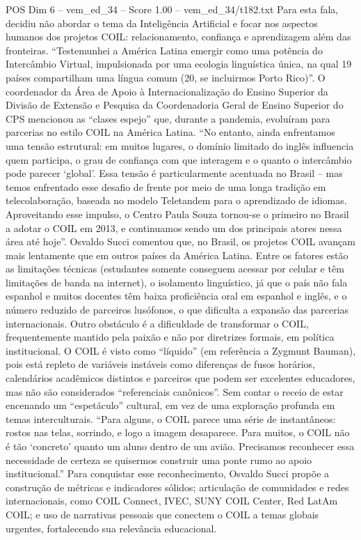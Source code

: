 \begin{textsample}{POS Dim 6 – vem\_ed\_34 – Score 1.00 – vem\_ed\_34/t182.txt}
Para esta fala, decidiu não abordar o tema da Inteligência Artificial e focar nos aspectos humanos dos projetos COIL: relacionamento, confiança e aprendizagem além das fronteiras. “Testemunhei a América Latina emergir como uma potência do Intercâmbio Virtual, impulsionada por uma ecologia linguística única, na qual 19 países compartilham uma língua comum (20, se incluirmos Porto Rico)”.
O coordenador da Área de Apoio à Internacionalização do Ensino Superior da Divisão de Extensão e Pesquisa da Coordenadoria Geral de Ensino Superior do CPS mencionou as “clases espejo” que, durante a pandemia, evoluíram para parcerias no estilo COIL na América Latina. “No entanto, ainda enfrentamos uma tensão estrutural: em muitos lugares, o domínio limitado do inglês influencia quem participa, o grau de confiança com que interagem e o quanto o intercâmbio pode parecer ‘global’.
Essa tensão é particularmente acentuada no Brasil – mas temos enfrentado esse desafio de frente por meio de uma longa tradição em telecolaboração, baseada no modelo Teletandem para o aprendizado de idiomas.
Aproveitando esse impulso, o Centro Paula Souza tornou-se o primeiro no Brasil a adotar o COIL em 2013, e continuamos sendo um dos principais atores nessa área até hoje”.
Osvaldo Succi comentou que, no Brasil, os projetos COIL avançam mais lentamente que em outros países da América Latina.
Entre os fatores estão as limitações técnicas (estudantes somente conseguem acessar por celular e têm limitações de banda na internet), o isolamento linguístico, já que o país não fala espanhol e muitos docentes têm baixa proficiência oral em espanhol e inglês, e o número reduzido de parceiros lusófonos, o que dificulta a expansão das parcerias internacionais.
Outro obstáculo é a dificuldade de transformar o COIL, frequentemente mantido pela paixão e não por diretrizes formais, em política institucional.
O COIL é visto como “líquido” (em referência a Zygmunt Bauman), pois está repleto de variáveis instáveis como diferenças de fusos horários, calendários acadêmicos distintos e parceiros que podem ser excelentes educadores, mas não são considerados “referenciais canônicos”.
Sem contar o receio de estar encenando um “espetáculo” cultural, em vez de uma exploração profunda em temas interculturais. “Para alguns, o COIL parece uma série de instantâneos: rostos nas telas, sorrindo, e logo a imagem desaparece.
Para muitos, o COIL não é tão ‘concreto’ quanto um aluno dentro de um avião.
Precisamos reconhecer essa necessidade de certeza se quisermos construir uma ponte rumo ao apoio institucional.” Para conquistar esse reconhecimento, Osvaldo Succi propõe a construção de métricas e indicadores sólidos; articulação de comunidades e redes internacionais, como COIL Connect, IVEC, SUNY COIL Center, Red LatAm COIL; e uso de narrativas pessoais que conectem o COIL a temas globais urgentes, fortalecendo sua relevância educacional.

\end{textsample}
